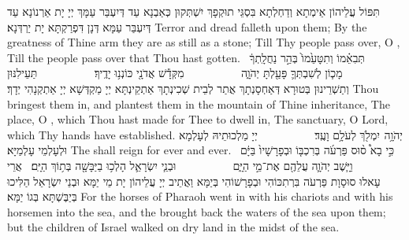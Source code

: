 {תִּפּוֹל עֲלֵיהוֹן אֵימְתָא וְדַחְלְתָא בִּסְגֵּי תוּקְפָךְ יִשְׁתְּקוּן כְּאַבְנָא עַד דְּיִעְבַּר עַמָּךְ יְיָ יָת אַרְנוֹנָא עַד דְּיִעְבַּר עַמָּא דְּנָן דִּפְרַקְתָּא יָת יַרְדְּנָא׃}
{Terror and dread falleth upon them; By the greatness of Thine arm they are as still as a stone; Till Thy people pass over, O \lord, Till the people pass over that Thou hast gotten.}{}
{תְּבִאֵ֗מוֹ וְתִטָּעֵ֙מוֹ֙ בְּהַ֣ר נַחֲלָֽתְךָ֔           מָכ֧וֹן לְשִׁבְתְּךָ֛ פָּעַ֖לְתָּ יְהֹוָ֑ה           מִקְּדָ֕שׁ אֲדֹנָ֖י כּוֹנְנ֥וּ יָדֶֽיךָ׃          
}
{תַּעֵילִנּוּן וְתַשְׁרֵינוּן בְּטוּרָא דְּאַחְסָנְתָךְ אֲתַר לְבֵית שְׁכִינְתָךְ אַתְקֵינְתָּא יְיָ מַקְדְּשָׁא יְיָ אַתְקְנָהִי יְדָךְ׃}
{Thou bringest them in, and plantest them in the mountain of Thine inheritance, The place, O \lord, which Thou hast made for Thee to dwell in, The sanctuary, O Lord, which Thy hands have established.}{}
{יְהֹוָ֥ה \pasek  יִמְלֹ֖ךְ לְעֹלָ֥ם וָעֶֽד׃          
}
{יְיָ מַלְכוּתֵיהּ לְעָלְמָא וּלְעָלְמֵי עָלְמַיָּא׃}
{The \lord\space shall reign for ever and ever.}{}
{כִּ֣י בָא֩ ס֨וּס פַּרְעֹ֜ה בְּרִכְבּ֤וֹ וּבְפָרָשָׁיו֙ בַּיָּ֔ם           וַיָּ֧שֶׁב יְהֹוָ֛ה עֲלֵהֶ֖ם אֶת־מֵ֣י הַיָּ֑ם           וּבְנֵ֧י יִשְׂרָאֵ֛ל הָלְכ֥וּ בַיַּבָּשָׁ֖ה בְּת֥וֹךְ הַיָּֽם׃ \petucha 
{}}
{אֲרֵי עָאלוּ סוּסָוָת פַּרְעֹה בִּרְתִכּוֹהִי וּבְפָרָשׁוֹהִי בְּיַמָּא וַאֲתֵיב יְיָ עֲלֵיהוֹן יָת מֵי יַמָּא וּבְנֵי יִשְׂרָאֵל הַלִּיכוּ בְּיַבֶּשְׁתָּא בְּגוֹ יַמָּא׃}
{For the horses of Pharaoh went in with his chariots and with his horsemen into the sea, and the \lord\space brought back the waters of the sea upon them; but the children of Israel walked on dry land in the midst of the sea.}{}

